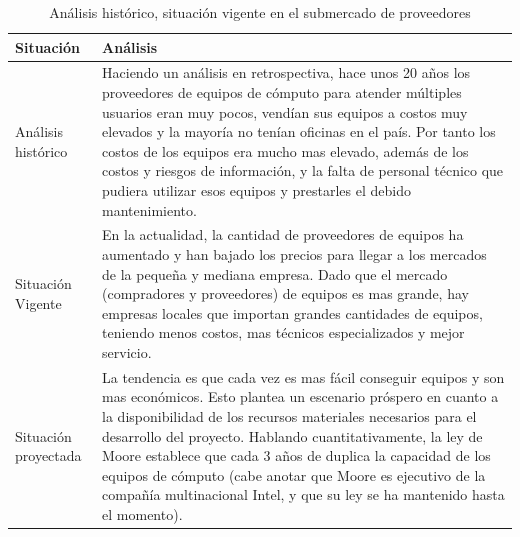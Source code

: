 \documentclass[a4paper, 12pt, oneside]{article}
\begin{document}
	\begin{table}
		\caption{Análisis histórico, situación vigente en el submercado de proveedores}
		\begin{tabular}{ | p{4cm} | p{10cm} | }
		\hline
		Situación & Análisis \\
		\hline					
		Análisis histórico & 
		Haciendo un análisis en retrospectiva, hace unos 20 años los proveedores de equipos de cómputo para atender múltiples usuarios eran muy pocos, vendían sus equipos a costos muy elevados y la mayoría no tenían oficinas en el país. Por tanto los costos de los equipos era mucho mas elevado, además de los costos y riesgos de información, y la falta de personal técnico que pudiera utilizar esos equipos y prestarles el debido mantenimiento. \\
		\hline
		Situación Vigente &
		En la actualidad, la cantidad de proveedores de equipos ha aumentado y han bajado los precios para llegar a los mercados de la pequeña y mediana empresa. Dado que el mercado (compradores y proveedores) de equipos es mas grande, hay empresas locales que importan grandes cantidades de equipos, teniendo menos costos, mas técnicos especializados y mejor servicio. \\
		\hline
		Situación proyectada &
		La tendencia es que cada vez es mas fácil conseguir equipos y son mas económicos. Esto plantea un escenario próspero en cuanto a la disponibilidad de los recursos materiales necesarios para el desarrollo del proyecto. Hablando cuantitativamente, la ley de Moore establece que cada 3 años de duplica la capacidad de los equipos de cómputo (cabe anotar que Moore es ejecutivo de la compañía multinacional Intel, y que su ley se ha mantenido hasta el momento). \\
		\hline
		\end{tabular}
		\label{provHistorico}
	\end{table}
	
\end{document}
